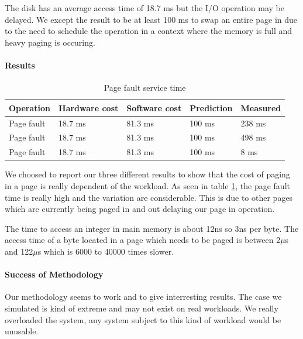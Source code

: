 The disk has an average access time of 18.7 ms but the I/O operation may be
delayed.
We except the result to be at least 100 ms to swap an entire page in due to
the need to schedule the operation in a context where the memory is full and
heavy paging is occuring.

\paragraph{Results}
\begin{table}[h]
\begin{center}
\begin{tabular}{| l | l | l | l | l |}
\hline
Operation 	& Hardware cost & Software cost & Prediction 	& Measured \\ \hline
Page fault	& 18.7 ms	& 81.3 ms 	& 100 ms	& 238 ms\\ \hline
Page fault	& 18.7 ms	& 81.3 ms 	& 100 ms	& 498 ms\\ \hline
Page fault	& 18.7 ms	& 81.3 ms 	& 100 ms	& 8 ms\\ \hline

\end{tabular}
\end{center}
\caption{Page fault service time\label{tab:page-fault}}
\end{table}

We choosed to report our three different results to show that the cost of paging
in a page is really dependent of the workload.
As seen in table \ref{tab:page-fault}, the page fault time is really high and the
variation are considerable.
This is due to other pages which are currently being paged in and out
delaying our page in operation.

The time to access an integer in main memory is about 12ns so 3ns per byte.
The access time of a byte located in a page which needs to be paged is
between 2$\mu$s and 122$\mu$s which is 6000 to 40000 times slower.

\paragraph{Success of Methodology}
Our methodology seems to work and to give interresting results.
The case we simulated is kind of extreme and may not exist on real workloads.
We really overloaded the system, any system subject to this kind of workload
would be unusable.
